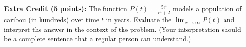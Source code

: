 \documentclass[12pt]{article}
\begin{document}
\begin{enumerate}



%
%

\end{enumerate}

\textbf{Extra Credit (5 points):} The function $\displaystyle P(t)=\frac{5e^t}{e^t+2}$ models a population of caribou (in hundreds) over time $t$ in years. Evaluate the $\displaystyle \lim_{x \to \infty} P(t)$ and interpret the answer in the context of the problem. (Your interpretation should be a complete sentence that a regular person can understand.)

%


\vspace{4in}
\end{document}
